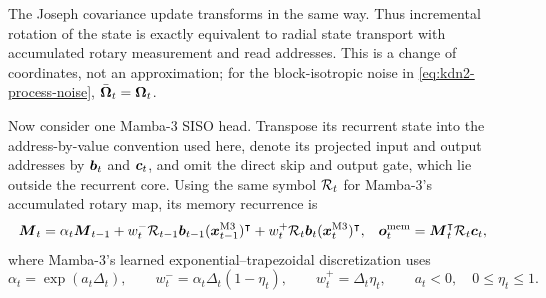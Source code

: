 \documentclass[11pt,letterpaper,logo]{yalearxiv}
\begin{document}
The Joseph covariance update transforms in the same way. Thus incremental rotation of the state
is exactly equivalent to radial state transport with accumulated rotary measurement and read
addresses. This is a change of coordinates, not an approximation; for the block-isotropic noise
in \eqref{eq:kdn2-process-noise}, \(\bar{\boldsymbol{\Omega}}_t=\boldsymbol{\Omega}_t\).

Now consider one Mamba-3 SISO head. Transpose its recurrent state into the address-by-value
convention used here, denote its projected input and output addresses by \(\boldsymbol{b}_t\) and
\(\boldsymbol{c}_t\), and omit the direct skip and output gate, which lie outside the recurrent core.
Using the same symbol \(\mathcal R_t\) for Mamba-3's accumulated rotary map, its memory recurrence is
\begin{equation}
\begin{aligned}
  \boldsymbol{M}_t
  &=
  \alpha_t\boldsymbol{M}_{t-1}
  +w_t^-\mathcal R_{t-1}\boldsymbol{b}_{t-1}(\boldsymbol{x}^{\mathrm{M3}}_{t-1})^{\intercal}
  +w_t^+\mathcal R_t\boldsymbol{b}_t(\boldsymbol{x}^{\mathrm{M3}}_t)^{\intercal},
  &
  \boldsymbol{o}^{\mathrm{mem}}_t
  &=
  \boldsymbol{M}_t^{\intercal}\mathcal R_t\boldsymbol{c}_t,
\end{aligned}
\label{eq:mamba3-siso-memory}
\end{equation}
where Mamba-3's learned exponential--trapezoidal discretization uses
\begin{equation}
  \alpha_t=\exp(a_t\Delta_t),
  \qquad
  w_t^-=\alpha_t\Delta_t(1-\eta_t),
  \qquad
  w_t^+=\Delta_t\eta_t,
  \qquad a_t<0,\quad 0\leq\eta_t\leq1.
  \label{eq:mamba3-trapezoidal-weights}
\end{equation}
\end{document}
